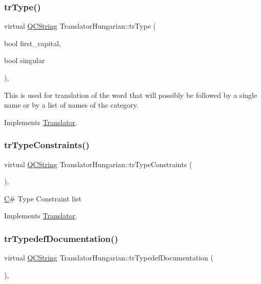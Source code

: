 \subsubsection{\texorpdfstring{trType()}{trType()}}
{\footnotesize\ttfamily virtual \mbox{\hyperlink{class_q_c_string}{Q\+C\+String}} Translator\+Hungarian\+::tr\+Type (\begin{DoxyParamCaption}\item[{bool}]{first\+\_\+capital,  }\item[{bool}]{singular }\end{DoxyParamCaption})\hspace{0.3cm}{\ttfamily [inline]}, {\ttfamily [virtual]}}

This is used for translation of the word that will possibly be followed by a single name or by a list of names of the category. 

Implements \mbox{\hyperlink{class_translator}{Translator}}.

\mbox{\label{class_translator_hungarian_aaa9d524f31711792a388cfdbd1ae7794}} 
\subsubsection{\texorpdfstring{trTypeConstraints()}{trTypeConstraints()}}
{\footnotesize\ttfamily virtual \mbox{\hyperlink{class_q_c_string}{Q\+C\+String}} Translator\+Hungarian\+::tr\+Type\+Constraints (\begin{DoxyParamCaption}{ }\end{DoxyParamCaption})\hspace{0.3cm}{\ttfamily [inline]}, {\ttfamily [virtual]}}

\mbox{\hyperlink{class_c}{C}}\# Type Constraint list 

Implements \mbox{\hyperlink{class_translator}{Translator}}.

\mbox{\label{class_translator_hungarian_ac234b2c1f3e5459c531a121d00883d3c}} 
\subsubsection{\texorpdfstring{trTypedefDocumentation()}{trTypedefDocumentation()}}
{\footnotesize\ttfamily virtual \mbox{\hyperlink{class_q_c_string}{Q\+C\+String}} Translator\+Hungarian\+::tr\+Typedef\+Documentation (\begin{DoxyParamCaption}{ }\end{DoxyParamCaption})\hspace{0.3cm}{\ttfamily [inline]}, {\ttfamily [virtual]}}


